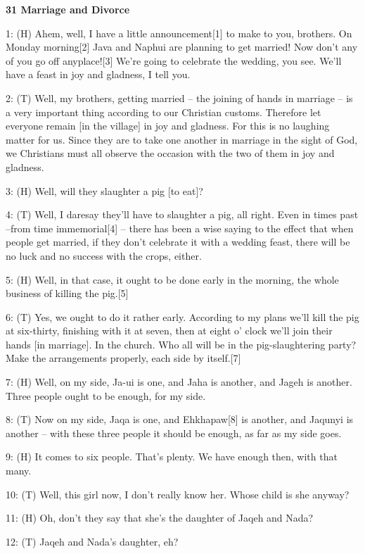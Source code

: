 
{\textbf{31 Marriage and Divorce}}

{1: (H) Ahem, well, I have a little announcement[1] to make to you, brothers.
On Monday morning[2] Java and Naphui are planning to get married! Now don't any
of you go off anyplace![3] We're going to celebrate the wedding, you see. We'll
have a feast in joy and gladness, I tell you. }

{2: (T) Well, my brothers, getting married -- the joining of hands in marriage
-- is a very important thing according to our Christian customs. Therefore let
everyone remain [in the village] in joy and gladness. For this is no laughing matter
for us. Since they are to take one another in marriage in the sight of God, we
Christians must all observe the occasion with the two of them in joy and gladness.
}

{3: (H) Well, will they slaughter a pig [to eat]?}

{4: (T) Well, I daresay they'll have to slaughter a pig, all right. Even
in times past --from time immemorial[4] -- there has been a wise saying to the
effect that when people get married, if they don't celebrate it with a wedding
feast, there will be no luck and no success with the crops, either. }

{5: (H) Well, in that case, it ought to be done early in the morning, the
whole business of killing the pig.[5] }

{6: (T) Yes, we ought to do it rather early. According to my plans we'll
kill the pig at six-thirty, finishing with it at seven, then at eight o' clock
we'll join their hands [in marriage]. In the church. Who all will be in the pig-slaughtering
party? Make the arrangements properly, each side by itself.[7]}

{7: (H) Well, on my side, Ja-ui is one, and Jaha is another, and Jageh is
another. Three people ought to be enough, for my side. }

{8: (T) Now on my side, Jaqa is one, and Ehkhapaw[8] is another, and Jaqunyi
is another -- with these three people it should be enough, as far as my side goes.
}

{9: (H) It comes to six people. That's plenty. We have enough then, with
that many. }

{10: (T) Well, this girl now, I don't really know her. Whose child is she
anyway?}

{11: (H) Oh, don't they say that she's the daughter of Jaqeh and Nada?}

{12: (T) Jaqeh and Nada's daughter, eh?}


